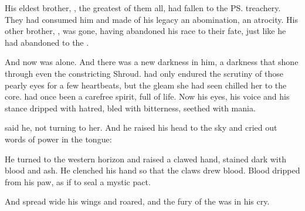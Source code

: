 His eldest brother, , the greatest of them all, had fallen to the \ps{\resphain} treachery. 
They had consumed him and made of his legacy an abomination, an atrocity. 
His other brother, , was gone, having abandoned his race to their fate, just like he had abandoned \Nexagglachel{} to the \resphain. 

And now \IrocasSecherdamon{} was alone. 
And there was a new darkness in him, a darkness that shone through even the constricting Shroud. 
\Cryocas{} had only endured the scrutiny of those pearly eyes for a few heartbeats, but the gleam she had seen chilled her to the core. 
\Secherdamon{} had once been a carefree spirit, full of life. 
Now his eyes, his voice and his stance dripped with hatred, bled with bitterness, seethed with mania. 

\ta{\CryocasNzessuacrith,} said he, not turning to her. 
And he raised his head to the sky and cried out words of power in the  tongue: 


He turned to the western horizon and raised a clawed hand, stained dark with blood and ash. 
He clenched his hand so that the claws drew blood. 
Blood dripped from his paw, as if to seal a mystic pact. 

And \Secherdamon{} spread wide his wings and roared, and the fury of the \xzaishanns{} was in his cry. 

